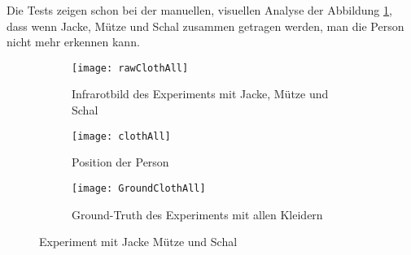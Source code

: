 Die Tests zeigen schon bei der manuellen, visuellen Analyse der Abbildung \ref{fig:rawClothAll}, dass wenn Jacke, Mütze und Schal zusammen getragen werden, man die Person nicht mehr erkennen kann.

\begin{figure}[H]
	\begin{subfigure}{.45\linewidth}
		\centering
		\texttt{[image: rawClothAll]}
		\caption{Infrarotbild des Experiments mit Jacke, Mütze und Schal}
		\label{fig:rawClothAll}
	\end{subfigure}
	\begin{subfigure}{.45\linewidth}
		\centering
		\texttt{[image: clothAll]}
		\caption{Position der Person}
		\label{fig:AlgorithmsClothAll}
	\end{subfigure}
	\begin{subfigure}{\linewidth}
		\centering
		\texttt{[image: GroundClothAll]}
		\caption{Ground-Truth des Experiments mit allen Kleidern}
		\label{fig:groundTruthClothAll}
	\end{subfigure}
	\caption{Experiment mit Jacke Mütze und Schal}
	\label{fig:AllCloth}
\end{figure}

